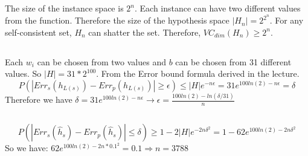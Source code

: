 \documentclass[letterpaper,11pt]{article}
\begin{document}
\subsection{}
The size of the instance space is $2^n$. Each instance can have two different
values from the function. 
Therefore the size of the hypothesis space
$|H_n|=2^{2^n}$.
For any self-consistent set, $H_n$ can shatter the set. Therefore,
$VC_{dim}(H_n) \ge 2^n$.
\subsection{}
Each $w_i$ can be chosen from two values and $b$ can be chosen from 31 different values.
So $|H|=31*2^{100}$.
From the Error bound formula derived in the lecture.
\begin{equation}
  P\left( |Err_s(h_{L(s)})-Err_p(h_{L(s)})|\ge \epsilon \right)\le
  |H|e^{-n\epsilon}=31e^{100ln(2)-n\epsilon}=\delta
\end{equation}
Therefore we have $\delta=31e^{100ln(2)-n\epsilon} \rightarrow
\epsilon=\frac{100ln(2)-ln(\delta/31)}{n}$
\subsection{}
\begin{equation}
  P\left( |Err_s(\hat{h}_{s})-Err_p(\hat{h}_{s})|\le \delta \right)\ge
  1-2|H|e^{-2n\delta^2}=1-62e^{100ln(2)-2n\delta^2}
\end{equation}
So we have:
$62e^{100ln(2)-2n*0.1^2}=0.1 \Rightarrow n=3788$
\end{document}
